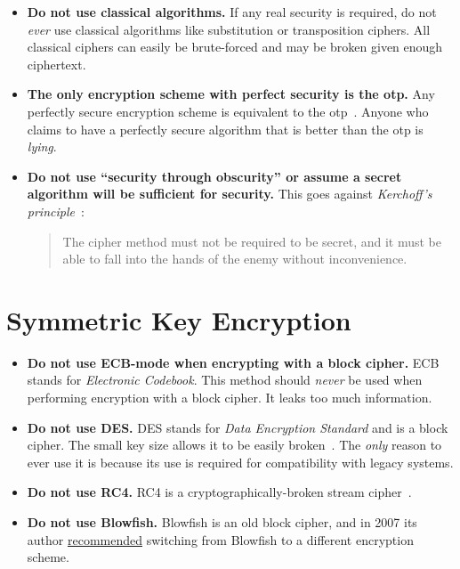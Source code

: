 \begin{itemize}
\item \textbf{Do not use classical algorithms.}
    If any real security is required, do not \emph{ever} use
    classical algorithms like substitution or transposition ciphers.
    All classical ciphers can easily be brute-forced and may
    be broken given enough ciphertext.

\item \textbf{The only \gls{encryption scheme} with \gls{perfect security}
    is the \gls{otp}.}
    Any perfectly secure encryption scheme is equivalent to the
    \gls{otp}~\cite[Theorems 2.10 and 2.11]{IntroModernCrypto}.
    Anyone who claims to have a perfectly secure algorithm
    that is better than the \gls{otp} is \emph{lying}.

\item \textbf{Do not use ``security through obscurity'' or
    assume a secret algorithm will be sufficient for security.}
    This goes against
    \emph{Kerchoff's principle}~\cite[Page 5]{IntroModernCrypto}:

\begin{quote}
    The cipher method must not be required to be secret,
    and it must be able to fall into the hands of the enemy
    without inconvenience.
\end{quote}

\end{itemize}

\section{Symmetric Key Encryption}

\begin{itemize}
\item \textbf{Do not use ECB-mode when encrypting with a \gls{block cipher}.}
    ECB stands for \emph{Electronic Codebook}.
    This method should \emph{never} be used when performing
        encryption with a \gls{block cipher}.
    It leaks too much information.
\item \textbf{Do not use DES.}
    DES stands for \emph{Data Encryption Standard} and is a \gls{block cipher}.
    The small key size allows it to be easily broken~\cite{rfc4772}.
    The \emph{only} reason to ever use it is because its use is required
        for compatibility with legacy systems.
\item \textbf{Do not use RC4.}
    RC4 is a cryptographically-broken \gls{stream cipher}~\cite{rfc7465}.
\item \textbf{Do not use Blowfish.}
    Blowfish is an old \gls{block cipher},
    and in 2007 its author
    \href{https://www.schneier.com/news/archives/2007/12/bruce_almighty_schne.html}{recommended}
    switching from Blowfish to a different \gls{encryption scheme}.

\end{itemize}

